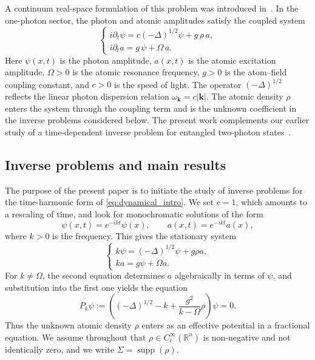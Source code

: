 \documentclass[12pt,a4paper]{amsart}
\numberwithin{equation}{section}
\theoremstyle{plain}
\theoremstyle{definition}
\begin{document}
A continuum real-space formulation of this problem was introduced in~\cite{Kraisler_Schotland}. In the one-photon sector, the photon and atomic amplitudes satisfy the coupled system
\begin{equation}\label{eq:dynamical_intro}
    \begin{cases}
        i\partial_t \psi = c(-\Delta)^{1/2}\psi + g\,\rho\, a, \\[2pt]
        i\partial_t a = g\,\psi + \Omega\, a.
    \end{cases}
\end{equation}
Here $\psi(x,t)$ is the photon amplitude, $a(x,t)$ is the atomic excitation
amplitude, $\Omega>0$ is the atomic resonance frequency, $g>0$ is the
atom--field coupling constant, and $c>0$ is the speed of light. The operator
$(-\Delta)^{1/2}$ reflects the linear photon dispersion relation
$\omega_{\mathbf k}=c|\mathbf k|$. The atomic density $\rho$ enters the
system through the coupling term and is the unknown coefficient in the inverse problems considered below. The present work complements our earlier study of a time-dependent inverse problem for entangled two-photon states~\cite{LNOS_two_photon}.


\subsection{Inverse problems and main results}


The purpose of the present paper is to initiate the study of inverse problems
for the time-harmonic form of \eqref{eq:dynamical_intro}. We set
$c=1$, which amounts to a rescaling of time, and look for monochromatic
solutions of the form
\begin{equation*}
    \psi(x,t)=e^{-ikt}\psi(x),
    \qquad
    a(x,t)=e^{-ikt}a(x),
\end{equation*}
where $k>0$ is the frequency. This gives the stationary system
\begin{equation}\label{eq:intro_stationary_system}
    \begin{cases}
        k\psi = (-\Delta)^{1/2}\psi + g\rho a,\\
        ka = g\psi+\Omega a.
    \end{cases}
\end{equation}
For $k\neq\Omega$, the second equation determines $a$ algebraically in
terms of $\psi$, and substitution into the first one yields the equation
\begin{equation}\label{eq:intro_Pk}
    P_k\psi :=
    \left(
        (-\Delta)^{1/2}-k+\frac{g^2}{k-\Omega}\rho
    \right)\psi = 0.
\end{equation}
Thus the unknown atomic density $\rho$ enters as an effective potential in a
fractional equation. We assume throughout that
$\rho\in C_c^\infty(\mathbb R^n)$ is non-negative and not identically zero,
and we write $\Sigma=\operatorname{supp}(\rho)$.
\end{document}
